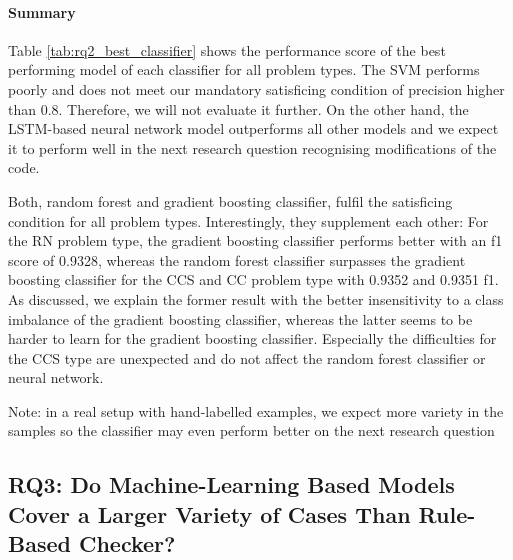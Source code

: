\paragraph{Summary}

 Table \ref{tab:rq2_best_classifier} shows the performance score of the best performing model of each classifier for all problem types.
 The SVM performs poorly and does not meet our mandatory satisficing condition of precision higher than 0.8. Therefore, we will not evaluate it further. On the other hand, the LSTM-based neural network model outperforms all other models and we expect it to perform well in the next research question recognising modifications of the code.

 Both, random forest and gradient boosting classifier, fulfil the satisficing condition for all problem types. Interestingly, they supplement each other: For the RN problem type, the gradient boosting classifier performs better with an f1 score of 0.9328, whereas the random forest classifier surpasses the gradient boosting classifier for the CCS and CC problem type with 0.9352 and 0.9351 f1. As discussed, we explain the former result with the better insensitivity to a class imbalance of the gradient boosting classifier, whereas the latter seems to be harder to learn for the gradient boosting classifier. Especially the difficulties for the CCS type are unexpected and do not affect the random forest classifier or neural network.
 
 Note: in a real setup with hand-labelled examples, we expect more variety in the samples so the classifier may even perform better on the next research question 


 \subsection{RQ3: Do Machine-Learning Based Models Cover a Larger Variety of Cases Than Rule-Based Checker? }

